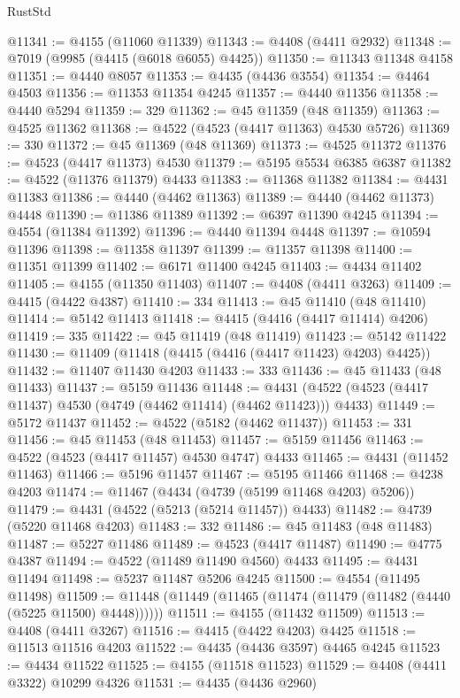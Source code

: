 \begin{lexlean}{RustStd}
\begin{coremodule}
{\begin{coremodule}
{{{{{{{{{{{{{{{{{{{{{{{{{{{{{{{{{{{{{{{{{{{{{{{{{{{{{{{{{{{{@11341 := @4155 (@11060 @11339)
@11343 := @4408 (@4411 @2932)
@11348 := @7019 (@9985 (@4415 (@6018 @6055) @4425))
@11350 := @11343 @11348 @4158
@11351 := @4440 @8057
@11353 := @4435 (@4436 @3554)
@11354 := @4464 @4503
@11356 := @11353 @11354 @4245
@11357 := @4440 @11356
@11358 := @4440 @5294
@11359 := 329
@11362 := @45 @11359 (@48 @11359)
@11363 := @4525 @11362
@11368 := @4522 (@4523 (@4417 @11363) @4530 @5726)
@11369 := 330
@11372 := @45 @11369 (@48 @11369)
@11373 := @4525 @11372
@11376 := @4523 (@4417 @11373) @4530
@11379 := @5195 @5534 @6385 @6387
@11382 := @4522 (@11376 @11379) @4433
@11383 := @11368 @11382
@11384 := @4431 @11383
@11386 := @4440 (@4462 @11363)
@11389 := @4440 (@4462 @11373) @4448
@11390 := @11386 @11389
@11392 := @6397 @11390 @4245
@11394 := @4554 (@11384 @11392)
@11396 := @4440 @11394 @4448
@11397 := @10594 @11396
@11398 := @11358 @11397
@11399 := @11357 @11398
@11400 := @11351 @11399
@11402 := @6171 @11400 @4245
@11403 := @4434 @11402
@11405 := @4155 (@11350 @11403)
@11407 := @4408 (@4411 @3263)
@11409 := @4415 (@4422 @4387)
@11410 := 334
@11413 := @45 @11410 (@48 @11410)
@11414 := @5142 @11413
@11418 := @4415 (@4416 (@4417 @11414) @4206)
@11419 := 335
@11422 := @45 @11419 (@48 @11419)
@11423 := @5142 @11422
@11430 := @11409 (@11418 (@4415 (@4416 (@4417 @11423) @4203) @4425))
@11432 := @11407 @11430 @4203
@11433 := 333
@11436 := @45 @11433 (@48 @11433)
@11437 := @5159 @11436
@11448 := @4431 (@4522 (@4523 (@4417 @11437) @4530 (@4749 (@4462 @11414) (@4462 @11423))) @4433)
@11449 := @5172 @11437
@11452 := @4522 (@5182 (@4462 @11437))
@11453 := 331
@11456 := @45 @11453 (@48 @11453)
@11457 := @5159 @11456
@11463 := @4522 (@4523 (@4417 @11457) @4530 @4747) @4433
@11465 := @4431 (@11452 @11463)
@11466 := @5196 @11457
@11467 := @5195 @11466
@11468 := @4238 @4203
@11474 := @11467 (@4434 (@4739 (@5199 @11468 @4203) @5206))
@11479 := @4431 (@4522 (@5213 (@5214 @11457)) @4433)
@11482 := @4739 (@5220 @11468 @4203)
@11483 := 332
@11486 := @45 @11483 (@48 @11483)
@11487 := @5227 @11486
@11489 := @4523 (@4417 @11487)
@11490 := @4775 @4387
@11494 := @4522 (@11489 @11490 @4560) @4433
@11495 := @4431 @11494
@11498 := @5237 @11487 @5206 @4245
@11500 := @4554 (@11495 @11498)
@11509 := @11448 (@11449 (@11465 (@11474 (@11479 (@11482 (@4440 (@5225 @11500) @4448))))))
@11511 := @4155 (@11432 @11509)
@11513 := @4408 (@4411 @3267)
@11516 := @4415 (@4422 @4203) @4425
@11518 := @11513 @11516 @4203
@11522 := @4435 (@4436 @3597) @4465 @4245
@11523 := @4434 @11522
@11525 := @4155 (@11518 @11523)
@11529 := @4408 (@4411 @3322) @10299 @4326
@11531 := @4435 (@4436 @2960)
}}}}}}}}}}}}}}}}}}}}}}}}}}}}}}}}}}}}}}}}}}}}}}}}}}}}}}}}}}}}
\end{coremodule}}
\end{coremodule}
\end{lexlean}
